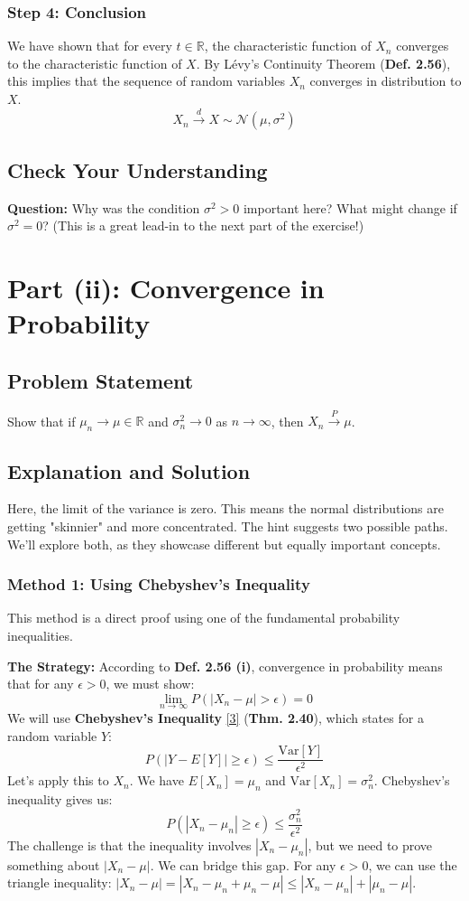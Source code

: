 \documentclass[11pt,a4paper]{article}
\begin{document}
\subsubsection*{Step 4: Conclusion}
We have shown that for every $t \in \mathbb{R}$, the characteristic function of $X_n$ converges to the characteristic function of $X$. By Lévy's Continuity Theorem (\textbf{Def. 2.56}), this implies that the sequence of random variables $X_n$ converges in distribution to $X$.
\[ X_n \stackrel{d}{\longrightarrow} X \sim \mathcal{N}(\mu, \sigma^2) \]

\subsection*{Check Your Understanding}
\textbf{Question:} Why was the condition $\sigma^2 > 0$ important here? What might change if $\sigma^2=0$? (This is a great lead-in to the next part of the exercise!)

\section{Part (ii): Convergence in Probability}

\subsection*{Problem Statement}
Show that if $\mu_n \to \mu \in \mathbb{R}$ and $\sigma_n^2 \to 0$ as $n \to \infty$, then $X_n \stackrel{P}{\longrightarrow} \mu$.

\subsection*{Explanation and Solution}
Here, the limit of the variance is zero. This means the normal distributions are getting "skinnier" and more concentrated. The hint suggests two possible paths. We'll explore both, as they showcase different but equally important concepts.

\subsubsection*{Method 1: Using Chebyshev's Inequality}
This method is a direct proof using one of the fundamental probability inequalities.

\textbf{The Strategy:}
According to \textbf{Def. 2.56 (i)}, convergence in probability means that for any $\epsilon > 0$, we must show:
\[ \lim_{n \to \infty} P(|X_n - \mu| > \epsilon) = 0 \]
We will use \textbf{Chebyshev's Inequality} \hyperlink{note3}{[3]} (\textbf{Thm. 2.40}), which states for a random variable $Y$:
\[ P(|Y - E[Y]| \ge \epsilon) \le \frac{\text{Var}[Y]}{\epsilon^2} \]
Let's apply this to $X_n$. We have $E[X_n] = \mu_n$ and $\text{Var}[X_n] = \sigma_n^2$. Chebyshev's inequality gives us:
\[ P(|X_n - \mu_n| \ge \epsilon) \le \frac{\sigma_n^2}{\epsilon^2} \]
The challenge is that the inequality involves $|X_n - \mu_n|$, but we need to prove something about $|X_n - \mu|$. We can bridge this gap. For any $\epsilon > 0$, we can use the triangle inequality: $|X_n - \mu| = |X_n - \mu_n + \mu_n - \mu| \le |X_n - \mu_n| + |\mu_n - \mu|$.
\end{document}

